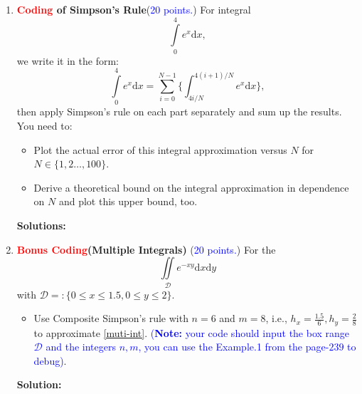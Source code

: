 \documentclass[11pt]{article}
\begin{document}
\begin{enumerate}
\item \textbf{\textcolor{red}{Coding} of Simpson's Rule}(\textcolor{blue}{20 points.}) For integral
\begin{equation}
    \int\limits_{0}^{4} e^x \mathrm{d}x,
\end{equation}
we write it in the form:
\begin{equation}
    \int\limits_{0}^{4} e^x \mathrm{d}x = \sum_{i=0}^{N-1}\{\int_{4i/N}^{4(i+1)/N}e^x\mathrm{d}x\},
\end{equation}
 then apply Simpson's rule on each part separately and sum up the results. You need to:
 \begin{itemize}
     \item Plot the actual error of this integral approximation versus $N$ for $N \in\{1,2\ldots,100\}$.
     \item Derive a theoretical bound on the integral approximation in dependence on $N$ and plot this upper bound, too.
 \end{itemize}
\textbf{Solutions:}

\item \textbf{\textcolor{red}{Bonus Coding}(Multiple Integrals) }(\textcolor{blue}{20 points.}) For the 
  \begin{equation}\label{muti-int}
    \iint\limits_{\mathcal{D}} e^{-xy}\mathrm{d}x\mathrm{d}y
  \end{equation}
  with $\mathcal{D}=:\{0\le x \le 1.5, 0\le y \le 2 \} $.
 \begin{itemize}
     \item Use Composite Simpson's rule with $n=6 $ and $m=8 $, {i.e.}, $h_{x} = \frac{1.5}{6},h_{y} = \frac{2}{8} $ to approximate \eqref{muti-int}.
     \textcolor{blue}{(\textbf{Note:} your code should input the box range $\mathcal{D} $ and the integers $n,m $, you can use the Example.1 from the page-$239 $ to debug)}.  
\end{itemize}
\textbf{Solution:}
 


\end{enumerate}
\end{document}
